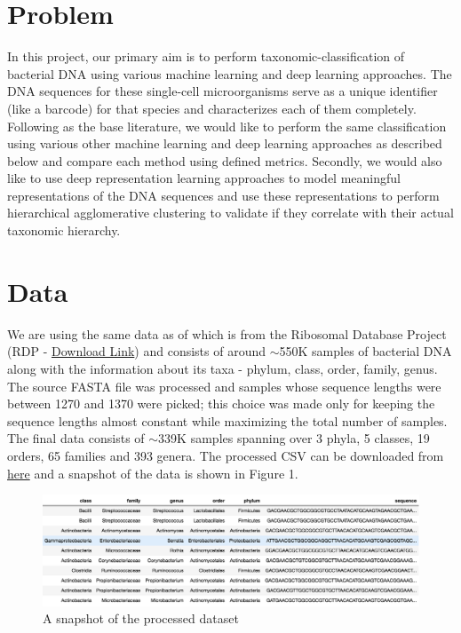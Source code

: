 \documentclass[12pt]{article}
\begin{document}
\maketitle

\section{Problem}

In this project, our primary aim is to perform taxonomic-classification of bacterial DNA
using various machine learning and deep learning approaches. The DNA sequences for these single-cell microorganisms serve as a unique identifier (like a barcode) for that species and characterizes each of them completely. Following \cite{src_work} as the base literature, we would like to perform the same classification using various other machine learning and deep learning approaches as described below and compare each method using defined metrics. Secondly, we would also like to use deep representation learning approaches to model meaningful representations of the DNA sequences and use these representations to perform hierarchical agglomerative clustering to validate if they correlate with their actual taxonomic hierarchy.

\section{Data}
We are using the same data as of \cite{src_work} which is from the Ribosomal Database Project (RDP \cite{rdp} -
{\color{blue}\href{https://rdp.cme.msu.edu/download/current_Bacteria_unaligned.fa.gz}{Download Link}}) and consists of around $\sim$550K samples of bacterial DNA along with the information about its taxa - phylum, class, order, family, genus. The source FASTA file was processed and samples whose sequence lengths were between 1270 and 1370 were picked; this choice was made only for keeping the sequence lengths almost constant while maximizing the total number of samples. The final data consists of $\sim$339K samples spanning over 3 phyla, 5 classes, 19 orders, 65 families and 393 genera. The processed CSV can be downloaded from {\color{blue}\href{https://www.dropbox.com/s/p7kb7aih0xurqxh/taxa.csv}{here}} and a snapshot of the data is shown in Figure 1.

\begin{figure}
\centering
\includegraphics[scale=0.25]{data_snapshot.png}
\caption{A snapshot of the processed dataset}
\end{figure}
\end{document}
